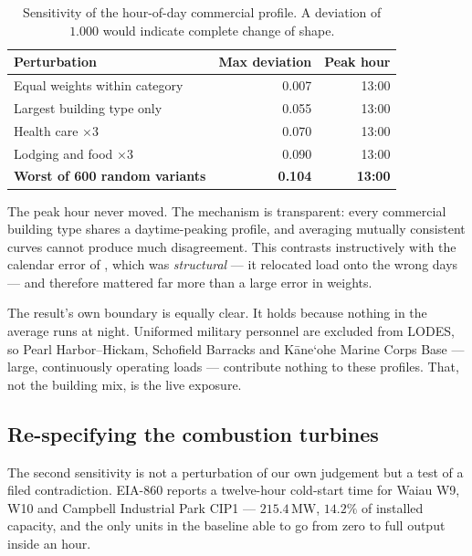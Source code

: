 \documentclass[11pt,a4paper]{article}
\theoremstyle{definition}
\theoremstyle{plain}
\theoremstyle{remark}
\newcommand{\MW}{\,\mathrm{MW}}
\newcommand{\okina}{\textquoteleft}
\begin{document}
\begin{table}[htbp]
\centering
\caption{Sensitivity of the hour-of-day commercial profile. A deviation of
$1.000$ would indicate complete change of shape.}
\label{tab:sens}
\small
\begin{tabular}{lrr}
\toprule
Perturbation & Max deviation & Peak hour \\
\midrule
Equal weights within category      & 0.007 & 13:00 \\
Largest building type only         & 0.055 & 13:00 \\
Health care $\times 3$             & 0.070 & 13:00 \\
Lodging and food $\times 3$        & 0.090 & 13:00 \\
\textbf{Worst of 600 random variants} & \textbf{0.104} & \textbf{13:00} \\
\bottomrule
\end{tabular}
\end{table}

The peak hour never moved. The mechanism is transparent: every commercial
building type shares a daytime-peaking profile, and averaging mutually
consistent curves cannot produce much disagreement. This contrasts instructively
with the calendar error of , which was \emph{structural} --- it
relocated load onto the wrong days --- and therefore mattered far more than a
large error in weights.

The result's own boundary is equally clear. It holds because nothing in the
average runs at night. Uniformed military personnel are excluded from LODES, so
Pearl Harbor--Hickam, Schofield Barracks and K\=ane\okina ohe Marine Corps Base
--- large, continuously operating loads --- contribute nothing to these
profiles. That, not the building mix, is the live exposure.

\subsection{Re-specifying the combustion turbines}
\label{sec:gtslow}

The second sensitivity is not a perturbation of our own judgement but a test of
a filed contradiction. EIA-860 reports a twelve-hour cold-start time for Waiau
W9, W10 and Campbell Industrial Park CIP1 --- $215.4\MW$, $14.2\%$ of installed
capacity, and the only units in the baseline able to go from zero to full output
inside an hour.
\end{document}
